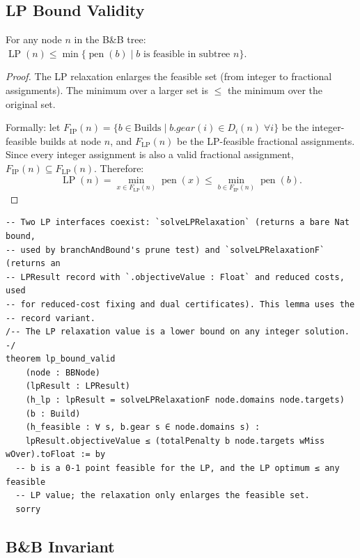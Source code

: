 \documentclass[11pt, a4paper, oneside]{book}
\newcommand{\pen}{\operatorname{pen}}
\newcommand{\LP}{\operatorname{LP}}
\newcommand{\IP}{\operatorname{IP}}
\begin{document}
\subsection{LP Bound Validity}

\begin{lembox}[title={LP Relaxation is a Valid Lower Bound}]
For any node $n$ in the B\&B tree:
$\LP(n) \leq \min\{\pen(b) \mid b \text{ is feasible in subtree } n\}$.
\end{lembox}

\begin{proof}
The LP relaxation enlarges the feasible set (from integer to fractional
assignments).  The minimum over a larger set is $\leq$ the minimum over
the original set.

Formally: let $F_{\IP}(n) = \{b \in \text{Builds} \mid b.gear(i) \in D_i(n)\;\forall i\}$
be the integer-feasible builds at node $n$, and $F_{\LP}(n)$ be the LP-feasible
fractional assignments.  Since every integer assignment is also a valid
fractional assignment, $F_{\IP}(n) \subseteq F_{\LP}(n)$.  Therefore:
\[
  \LP(n) = \min_{x \in F_{\LP}(n)} \pen(x) \leq \min_{b \in F_{\IP}(n)} \pen(b).
\]
\end{proof}

\begin{leanbox}[title={Lean 4 (Mathlib) --- LP Bound Validity (specification)}]
\begin{verbatim}
-- Two LP interfaces coexist: `solveLPRelaxation` (returns a bare Nat bound,
-- used by branchAndBound's prune test) and `solveLPRelaxationF` (returns an
-- LPResult record with `.objectiveValue : Float` and reduced costs, used
-- for reduced-cost fixing and dual certificates). This lemma uses the
-- record variant.
/-- The LP relaxation value is a lower bound on any integer solution. -/
theorem lp_bound_valid
    (node : BBNode)
    (lpResult : LPResult)
    (h_lp : lpResult = solveLPRelaxationF node.domains node.targets)
    (b : Build)
    (h_feasible : ∀ s, b.gear s ∈ node.domains s) :
    lpResult.objectiveValue ≤ (totalPenalty b node.targets wMiss wOver).toFloat := by
  -- b is a 0-1 point feasible for the LP, and the LP optimum ≤ any feasible
  -- LP value; the relaxation only enlarges the feasible set.
  sorry
\end{verbatim}
\end{leanbox}

\subsection{B\&B Invariant}
\end{document}

